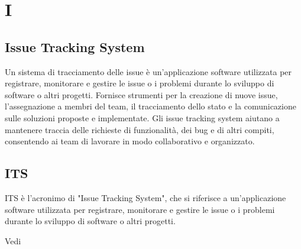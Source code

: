 \section{I}

\vspace{2em}
\subsection*{Issue Tracking System}
Un sistema di tracciamento delle issue è un'applicazione software utilizzata per registrare, monitorare e gestire le issue o i problemi durante lo sviluppo di software o altri progetti. Fornisce strumenti per la creazione di nuove issue, l'assegnazione a membri del team, il tracciamento dello stato e la comunicazione sulle soluzioni proposte e implementate. Gli issue tracking system aiutano a mantenere traccia delle richieste di funzionalità, dei bug e di altri compiti, consentendo ai team di lavorare in modo collaborativo e organizzato.

\vspace{2em}
\subsection*{ITS}
ITS è l'acronimo di "Issue Tracking System", che si riferisce a un'applicazione software utilizzata per registrare, monitorare e gestire le issue o i problemi durante lo sviluppo di software o altri progetti.

\par Vedi 

